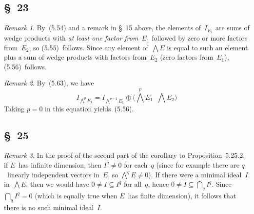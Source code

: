 \documentclass[letterpaper,12pt]{article}
\newcommand{\bigsect}{\bigcap}
\newcommand{\dsum}{\oplus}
\newcommand{\stprod}{\mathop{\widehat{\otimes}}}
\newcommand{\bigeprod}{\bigwedge}
\newcommand{\medeprod}{{\textstyle\bigeprod}}
\theoremstyle{definition}
\theoremstyle{remark}
\newtheorem*{rmk}{Remark}
\begin{document}
\subsection*{\S~23}
\begin{rmk}
By~(5.54) and a remark in \S~15 above, the elements of~\(I_{E_1}\) are sums of wedge products with \emph{at least one factor from~\(E_1\)} followed by zero or more factors from~\(E_2\), so (5.55)~follows. Since any element of~\(\medeprod E\) is equal to such an element plus a sum of wedge products with factors from~\(E_2\) (zero factors from~\(E_1\)), (5.56)~follows.
\end{rmk}

\begin{rmk}
By~(5.63), we have
\[I_{\bigeprod^p E_1}=I_{\bigeprod^{p+1}E_1}\dsum\bigl(\medeprod^p E_1\stprod\medeprod E_2\bigr)\]
Taking \(p=0\) in this equation yields~(5.56).
\end{rmk}

\subsection*{\S~25}
\begin{rmk}
In the proof of the second part of the corollary to Proposition~5.25.2, if \(E\)~has infinite dimension, then \(I^q\ne 0\) for each~\(q\) (since for example there are \(q\)~linearly independent vectors in~\(E\), so \(\medeprod^q E\ne 0\)). If there were a minimal ideal~\(I\) in~\(\medeprod E\), then we would have \(0\ne I\subseteq I^q\) for all~\(q\), hence \(0\ne I\subseteq\bigsect_q I^q\). Since \(\bigsect_q I^q=0\) (which is equally true when \(E\)~has finite dimension), it follows that there is no such minimal ideal~\(I\).
\end{rmk}
\end{document}
